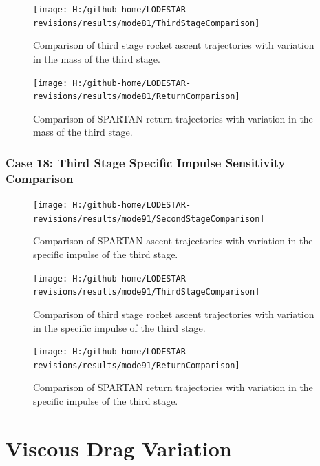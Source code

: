 \begin{figure}[!th]
\centering
\texttt{[image: H:/github-home/LODESTAR-revisions/results/mode81/ThirdStageComparison]}
\caption{Comparison of third stage rocket ascent trajectories with variation in the mass of the third stage.}
\label{fig:ThirdStageComparison14}
\end{figure}



\begin{figure}[!th]
	\centering
	\texttt{[image: H:/github-home/LODESTAR-revisions/results/mode81/ReturnComparison]}
	\caption{Comparison of SPARTAN return trajectories with variation in the mass of the third stage.}
	\label{fig:ReturnComparison14}
\end{figure}
\FloatBarrier
\clearpage
\subsection{Case 18: Third Stage Specific Impulse Sensitivity Comparison}\label{sec:app_comparison91}

\begin{figure}[!th]
\centering
\texttt{[image: H:/github-home/LODESTAR-revisions/results/mode91/SecondStageComparison]}
\caption{Comparison of SPARTAN ascent trajectories with variation in the specific impulse of the third stage.}
\label{fig:SecondStageComparison15}
\end{figure}


\begin{figure}[!th]
\centering
\texttt{[image: H:/github-home/LODESTAR-revisions/results/mode91/ThirdStageComparison]}
\caption{Comparison of third stage rocket ascent trajectories with variation in the specific impulse of the third stage.}
\label{fig:ThirdStageComparison15}
\end{figure}


\begin{figure}[!th]
\centering
\texttt{[image: H:/github-home/LODESTAR-revisions/results/mode91/ReturnComparison]}
\caption{Comparison of SPARTAN return trajectories with variation in the specific impulse of the third stage.}
\label{fig:ReturnComparison15}
\end{figure}


\chapter{Viscous Drag Variation}

